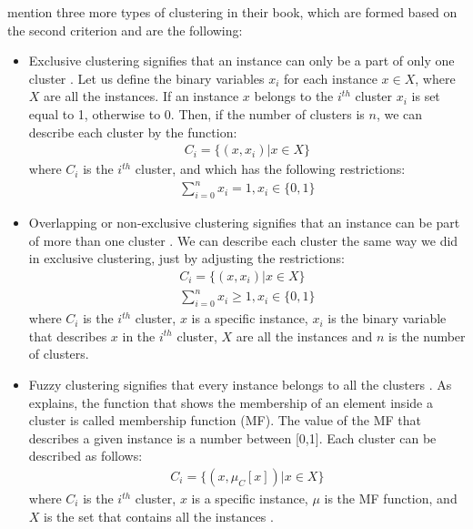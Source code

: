 \textcite{tanSteinKum} mention three more types of clustering in their book, which are formed based on the second criterion and are the following: \\
\begin{itemize}
\item Exclusive clustering signifies that an instance can only be a part of only one cluster \autocite[492]{tanSteinKum}. Let us define the binary variables \(x_{i}\) for each instance \(x \in X \), where \(X\) are all the instances. If an instance \(x\) belongs to the \(i^{th}\) cluster \(x_{i}\) is set equal to 1, otherwise to 0. Then, if the number of clusters is \(n\), we can describe each cluster by the function:
\begin{eqnarray*}
C_{i} = \{(x, x_{i})|x \in X\}
\end{eqnarray*}
where \(C_{i}\) is the \(i^{th}\) cluster, and which has the following restrictions:
\begin{eqnarray*}
\sum_{i=0}^{n} x_{i} = 1, x_{i} \in \{0,1\}
\end{eqnarray*}
\item Overlapping or non-exclusive clustering signifies that an instance can be part of more than one cluster \autocite[492]{tanSteinKum}. We can describe each cluster the same way we did in exclusive clustering, just by adjusting the restrictions:
\begin{eqnarray*}
C_{i} = \{(x, x_{i})|x \in X\} \\
\sum_{i=0}^{n} x_{i} \geq 1, x_{i} \in \{0,1\}
\end{eqnarray*}
where \(C_{i}\) is the \(i^{th}\) cluster, \(x\) is a specific instance, \(x_{i}\) is the binary variable that describes \(x\) in the \(i^{th}\) cluster, \(X\) are all the instances and \(n\) is the number of clusters.
\item Fuzzy clustering signifies that every instance belongs to all the clusters \autocite[492]{tanSteinKum}. As \textcite{kantar} explains, the function that shows the membership of an element inside a cluster is called membership function (MF). The value of the MF that describes a given instance is a number between [0,1]. Each cluster can be described as follows:
\begin{eqnarray*}
C_{i} = \{(x, \mu_{C}[x])|x \in X\}
\end{eqnarray*}
where \(C_{i}\) is the \(i^{th}\) cluster, \(x\) is a specific instance, \(\mu\) is the MF function, and \( X\) is the set that contains all the instances \autocite[416]{kantar}.
\end{itemize}

